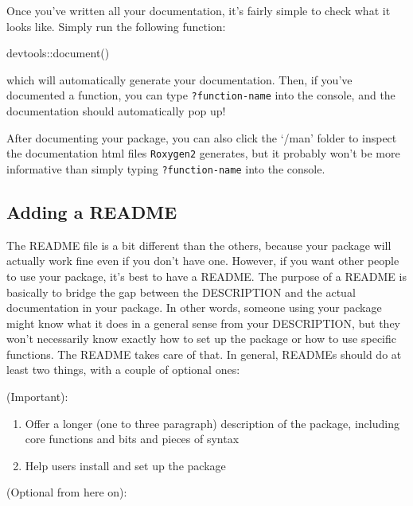 \documentclass[
]{book}
\newenvironment{Shaded}{\begin{snugshade}}{\end{snugshade}}
\newcommand{\FunctionTok}[1]{\textcolor[rgb]{0.00,0.00,0.00}{#1}}
\newcommand{\NormalTok}[1]{#1}
\newcommand{\SpecialCharTok}[1]{\textcolor[rgb]{0.00,0.00,0.00}{#1}}
\providecommand{\tightlist}{%
  \setlength{\itemsep}{0pt}\setlength{\parskip}{0pt}}
\begin{document}
Once you've written all your documentation, it's fairly simple to check what it looks like. Simply run the following function:

\begin{Shaded}
\begin{Highlighting}[]
\NormalTok{devtools}\SpecialCharTok{::}\FunctionTok{document}\NormalTok{()}
\end{Highlighting}
\end{Shaded}

which will automatically generate your documentation. Then, if you've documented a function, you can type \texttt{?function-name} into the console, and the documentation should automatically pop up!

After documenting your package, you can also click the `/man' folder to inspect the documentation html files \texttt{Roxygen2} generates, but it probably won't be more informative than simply typing \texttt{?function-name} into the console.

\hypertarget{adding-a-readme}{%
\subsection{Adding a README}\label{adding-a-readme}}

The README file is a bit different than the others, because your package will actually work fine even if you don't have one. However, if you want other people to use your package, it's best to have a README. The purpose of a README is basically to bridge the gap between the DESCRIPTION and the actual documentation in your package. In other words, someone using your package might know what it does in a general sense from your DESCRIPTION, but they won't necessarily know exactly how to set up the package or how to use specific functions. The README takes care of that. In general, READMEs should do at least two things, with a couple of optional ones:

(Important):

\begin{enumerate}
\def\labelenumi{\arabic{enumi}.}
\tightlist
\item
  Offer a longer (one to three paragraph) description of the package, including core functions and bits and pieces of syntax
\item
  Help users install and set up the package
\end{enumerate}

(Optional from here on):
\end{document}
